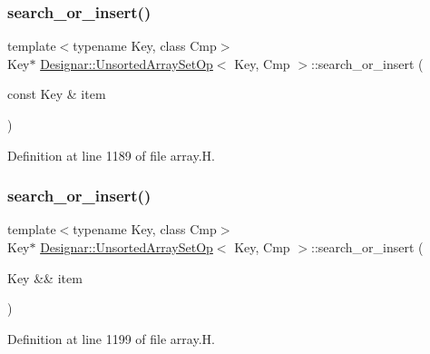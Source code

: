 \subsubsection{\texorpdfstring{search\+\_\+or\+\_\+insert()}{search\_or\_insert()}\hspace{0.1cm}{\footnotesize\ttfamily [1/2]}}
{\footnotesize\ttfamily template$<$typename Key, class Cmp$>$ \\
Key$\ast$ \hyperlink{class_designar_1_1_unsorted_array_set_op}{Designar\+::\+Unsorted\+Array\+Set\+Op}$<$ Key, Cmp $>$\+::search\+\_\+or\+\_\+insert (\begin{DoxyParamCaption}\item[{const Key \&}]{item }\end{DoxyParamCaption})\hspace{0.3cm}{\ttfamily [inline]}}



Definition at line 1189 of file array.\+H.

\mbox{\label{class_designar_1_1_unsorted_array_set_op_afbef93edb33f4767a16f27affaefcee3}} 
\subsubsection{\texorpdfstring{search\+\_\+or\+\_\+insert()}{search\_or\_insert()}\hspace{0.1cm}{\footnotesize\ttfamily [2/2]}}
{\footnotesize\ttfamily template$<$typename Key, class Cmp$>$ \\
Key$\ast$ \hyperlink{class_designar_1_1_unsorted_array_set_op}{Designar\+::\+Unsorted\+Array\+Set\+Op}$<$ Key, Cmp $>$\+::search\+\_\+or\+\_\+insert (\begin{DoxyParamCaption}\item[{Key \&\&}]{item }\end{DoxyParamCaption})\hspace{0.3cm}{\ttfamily [inline]}}



Definition at line 1199 of file array.\+H.

\mbox{\label{class_designar_1_1_unsorted_array_set_op_aa73bc195688fed065a7cdd6b3f06a02e}} 
